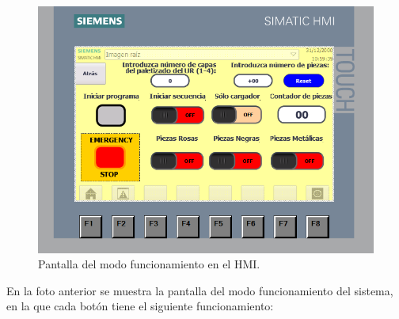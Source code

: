 \begin{figure} [h!]
  \begin{center}
    \includegraphics[width=13.5cm]{figs/HMI_funcionamiento}
  \end{center}
  \caption{\centering Pantalla del modo funcionamiento en el HMI.}
  \label{fig:HMI_funcionamiento}
\end{figure} 


En la foto anterior se muestra la pantalla del modo funcionamiento del sistema, en la que cada botón tiene el siguiente funcionamiento:

